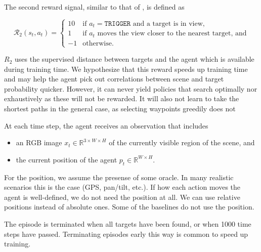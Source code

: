 The second reward signal, similar to that of \cite{caicedo_active_2015,...}, is defined as

\[
    \mathcal{R}_2(s_t, a_t) =
    \begin{cases}
        10 & \text{if \(a_t = \mathtt{TRIGGER}\) and a target is in view,} \\
         1 & \text{if \(a_t\) moves the view closer to the nearest target, and} \\
        -1 & \text{otherwise.}
    \end{cases}
\]

\(R_2\) uses the supervised distance between targets and the agent which is available during training time. %
We hypothesize that this reward speeds up training time and may help the agent pick out correlations between scene and target probability quicker.
However, it can never yield policies that search optimally nor exhaustively as these will not be rewarded.
It will also not learn to take the shortest paths in the general case, as selecting waypoints greedily does not 


At each time step, the agent receives an observation that includes

\begin{itemize}
    \item an RGB image \(x_t \in \mathbb{R}^{3 \times W \times H}\) of the currently visible region of the scene, and
    \item the current position of the agent \(p_t \in  \mathbb{R}^{W \times H}\). %
\end{itemize}

For the position, we assume the presense of some oracle.
In many realistic scenarios this is the case (GPS, pan/tilt, etc.).
If how each action moves the agent is well-defined, we do not need the position at all.
We can use relative positions instead of absolute ones.
Some of the baselines do not use the position.



The episode is terminated when all targets have been found, or when 1000 time steps have passed.
Terminating episodes early this way is common to speed up training. %

